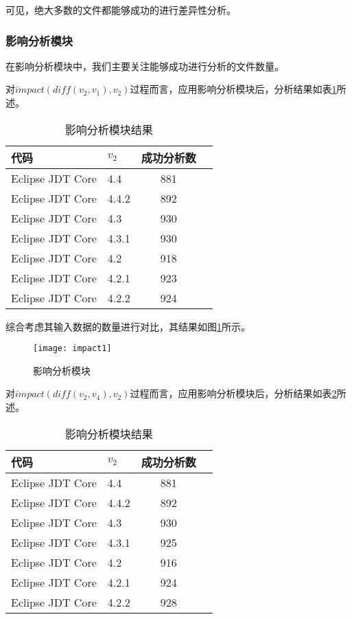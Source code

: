 可见，绝大多数的文件都能够成功的进行差异性分析。



\subsubsection{影响分析模块}

在影响分析模块中，我们主要关注能够成功进行分析的文件数量。

对$impact(diff(v_2,v_1),v_2)$过程而言，应用影响分析模块后，分析结果如表\ref {data_impact_1}所述。

\begin{table}[H]
	\caption{影响分析模块结果}
	\label{data_impact_1}
	\centering
	\begin{tabular}{llcc}
		\toprule[1.5pt]
		{\heiti 代码} & {\heiti $v_2$} & {\heiti 成功分析数}  \\\midrule[1pt]
		Eclipse JDT Core & 4.4	 & 881	\\
		Eclipse JDT Core & 4.4.2 & 892 	\\
		Eclipse JDT Core & 4.3	 & 930		\\
		Eclipse JDT Core & 4.3.1 & 930 	\\
		Eclipse JDT Core & 4.2 	 &	918		\\
		Eclipse JDT Core & 4.2.1 & 923	\\
		Eclipse JDT Core & 4.2.2  & 924		\\
		\bottomrule[1.5pt]
	\end{tabular}
\end{table}

综合考虑其输入数据的数量进行对比，其结果如图\ref {impact1}所示。

\begin{figure}[H]
	\centering
	\texttt{[image: impact1]}
	\caption {影响分析模块}
	\label {impact1}	
\end{figure}

对$impact(diff(v_2,v_4),v_2)$过程而言，应用影响分析模块后，分析结果如表\ref {data_impact_2}所述。

\begin{table}[H]
	\caption{影响分析模块结果}
	\label{data_impact_2}
	\centering
	\begin{tabular}{llcc}
		\toprule[1.5pt]
		{\heiti 代码} & {\heiti $v_2$} & {\heiti 成功分析数}  \\\midrule[1pt]
		Eclipse JDT Core & 4.4	 & 881	\\
		Eclipse JDT Core & 4.4.2 & 892	 	\\
		Eclipse JDT Core & 4.3	 & 930			\\
		Eclipse JDT Core & 4.3.1 & 925	 	\\
		Eclipse JDT Core & 4.2 	 & 916			\\
		Eclipse JDT Core & 4.2.1 	 & 924		\\
		Eclipse JDT Core & 4.2.2 	 & 928		\\
		\bottomrule[1.5pt]
	\end{tabular}
\end{table}

